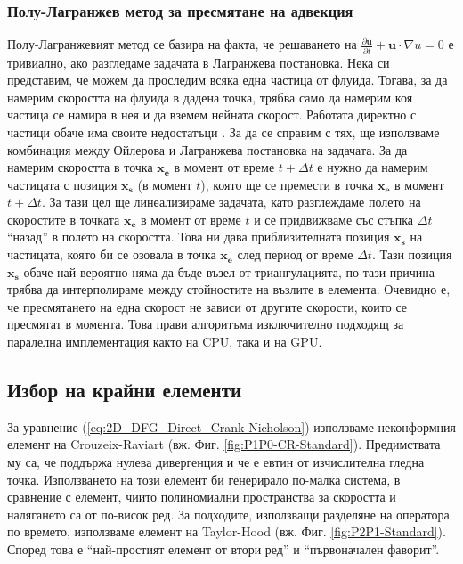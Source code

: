 \documentclass[12pt]{report}
\newcommand{\grad}[1]{\nabla#1}
\newcommand{\vecf}[1]{\mathbf{#1}}
\begin{document}
\subsubsection{Полу-Лагранжев метод за пресмятане на адвекция}
Полу-Лагранжевият метод се базира на факта, че решаването на $\frac{\partial\vecf{u}}{\partial t} + \vecf{u}\cdot\grad{u} = 0$ е тривиално, ако разгледаме задачата в Лагранжева постановка. Нека си представим, че можем да проследим всяка една частица от флуида. Тогава, за да намерим скоростта на флуида в дадена точка, трябва само да намерим коя частица се намира в нея и да вземем нейната скорост. Работата директно с частици обаче има своите недостатъци \cite{Bridson}. За да се справим с тях, ще използваме комбинация между Ойлерова и Лагранжева постановка на задачата. За да намерим скоростта в точка $\mathbf{x_e}$ в момент от време $t + \Delta t$ е нужно да намерим частицата с позиция $\mathbf{x_s}$ (в момент $t$), която ще се премести в точка $\mathbf{x_e}$ в момент $t + \Delta t$. За тази цел ще линеализираме задачата, като разглеждаме полето на скоростите в точката $\mathbf{x_e}$ в момент от време $t$ и се придвижваме със стъпка $\Delta t$ ``назад'' в полето на скоростта. Това ни дава приблизителната позиция $\mathbf{x_s}$ на частицата, която би се озовала в точка $\mathbf{x_e}$ след период от време $\Delta t$. Тази позиция $\mathbf{x_s}$ обаче най-вероятно няма да бъде възел от триангулацията, по тази причина трябва да интерполираме между стойностите на възлите в елемента. Очевидно е, че пресмятането на една скорост не зависи от другите скорости, които се пресмятат в момента. Това прави алгоритъма изключително подходящ за паралелна имплементация както на CPU, така и на GPU.       
\subsection{Избор на крайни елементи}
За уравнение (\ref{eq:2D_DFG_Direct_Crank-Nicholson}) използваме неконформния елемент на Crouzeix-Raviart (вж. Фиг. \ref{fig:P1P0-CR-Standard}). Предимствата му са, че поддържа нулева дивергенция и че е евтин от изчислителна гледна точка. Използването на този елемент би генерирало по-малка система, в сравнение с елемент, чиито полиномиални пространства за скоростта и налягането са от по-висок ред. За подходите, използващи разделяне на оператора по времето, използваме елемент на Taylor-Hood (вж. Фиг. \ref{fig:P2P1-Standard}). Според \cite{gresho-fem} това е ``най-простият елемент от втори ред'' и ``първоначален фаворит''.
\end{document}
